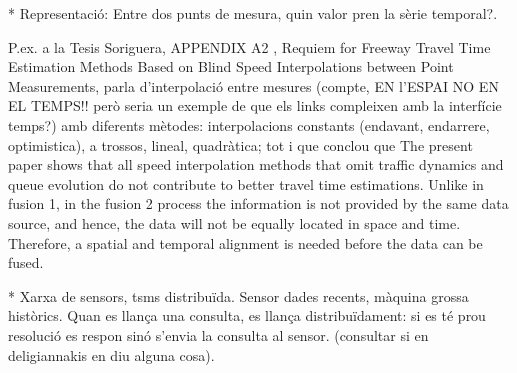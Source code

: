 \documentclass{acm_proc_article-sp}
\begin{document}
* Representació: Entre dos punts de mesura, quin valor pren la sèrie temporal?.





 P.ex. a la Tesis Soriguera, APPENDIX A2 , 
Requiem for Freeway Travel Time Estimation Methods Based
on Blind Speed Interpolations between Point Measurements, parla d'interpolació entre mesures (compte, EN l'ESPAI NO EN EL TEMPS!! però seria un exemple de que els links compleixen amb la interfície temps?) amb diferents mètodes:  interpolacions constants (endavant, endarrere, optimistica), a trossos, lineal, quadràtica;    tot i que conclou que The present paper shows that all speed interpolation methods that omit traffic
dynamics and queue evolution do not contribute to better travel time estimations. 
Unlike in fusion 1, in the fusion 2 process the information is not provided by the same
data source, and hence, the data will not be equally located in space and time. 
Therefore, a spatial and temporal alignment is needed before the data can be fused.


* Xarxa de sensors, tsms distribuïda. Sensor dades recents, màquina grossa històrics. Quan es llança una consulta, es llança distribuïdament: si es té prou resolució es respon sinó s'envia la consulta al sensor. (consultar si en deligiannakis en diu alguna cosa).







%
%
\printbibliography
%
%



\end{document}
